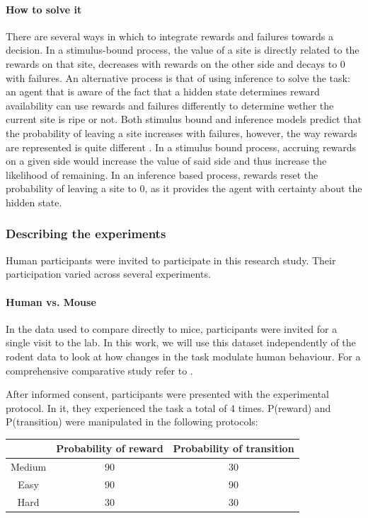 \documentclass[11pt]{article}
\begin{document}
\paragraph{How to solve it} There are several ways in which to integrate rewards and failures towards a decision. In a stimulus-bound process, the value of a site is directly related to the rewards on that site, decreases with rewards on the other side and decays to 0 with failures. An alternative process is that of using inference to solve the task: an agent that is aware of the fact that a hidden state determines reward availability can use rewards and failures differently to determine wether the current site is ripe or not.
Both stimulus bound and inference models predict that the probability of leaving a site increases with failures, however, the way rewards are represented is quite different \cite{vertechi2020inference}. In a stimulus bound process, accruing rewards on a given side would increase the value of said side and thus increase the likelihood of remaining. In an inference based process, rewards reset the probability of leaving a site to 0, as it provides the agent with certainty about the hidden state.


\subsubsection{Describing the experiments}
Human participants were invited to participate in this research study. Their participation varied across several experiments.
\paragraph{Human vs. Mouse} In the data used to compare directly to mice, participants were invited for a single visit to the lab. In this work, we will use this dataset independently of the rodent data to look at how changes in the task modulate human behaviour. For a comprehensive comparative study refer to \cite{vertechi2020inference}.

After informed consent, participants were presented with the experimental protocol. In it, they experienced the task a total of 4 times. P(reward) and P(transition) were manipulated in the following protocols:

\begin{center}
  \begin{tabular}{|c|c|c|}
  \hline
  & Probability of reward & Probability of transition \\
  \hline
  Medium & 90 & 30 \\
  \hline
  Easy & 90 & 90 \\
  \hline
  Hard & 30 & 30 \\
  \hline
  \end{tabular}
  \label{table_all}
\end{center}
\end{document}
